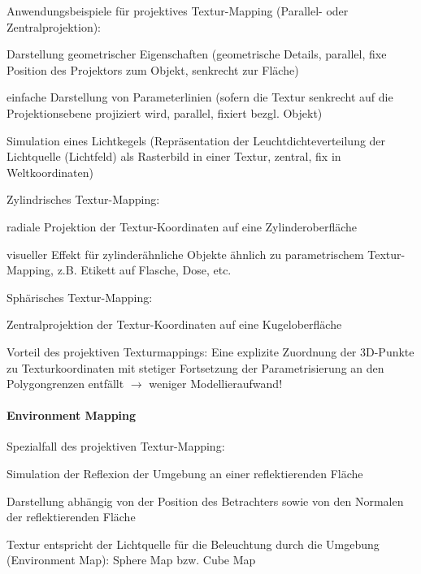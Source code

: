 \documentclass[landscape]{article}
\begin{document}
\begin{multicols}{3}
  Anwendungsbeispiele für projektives Textur-Mapping (Parallel- oder Zentralprojektion):
  \begin{itemize*}
    \item Darstellung geometrischer Eigenschaften (geometrische Details, parallel, fixe Position des Projektors zum Objekt, senkrecht zur Fläche)
    \item einfache Darstellung von Parameterlinien (sofern die Textur senkrecht auf die Projektionsebene projiziert wird, parallel, fixiert bezgl. Objekt)
    \item Simulation eines Lichtkegels (Repräsentation der Leuchtdichteverteilung der Lichtquelle (Lichtfeld) als Rasterbild in einer Textur, zentral, fix in Weltkoordinaten)
  \end{itemize*}
  
  Zylindrisches Textur-Mapping:
  \begin{itemize*}
    \item radiale Projektion der Textur-Koordinaten auf eine Zylinderoberfläche
    \item visueller Effekt für zylinderähnliche Objekte ähnlich zu parametrischem Textur-Mapping, z.B. Etikett auf Flasche, Dose, etc.
  \end{itemize*}
  
  Sphärisches Textur-Mapping:
  \begin{itemize*}
    \item Zentralprojektion der Textur-Koordinaten auf eine Kugeloberfläche
    \item Vorteil des projektiven Texturmappings: Eine explizite Zuordnung der 3D-Punkte zu Texturkoordinaten mit stetiger Fortsetzung der Parametrisierung an den Polygongrenzen entfällt $\rightarrow$ weniger Modellieraufwand!
  \end{itemize*}
  
  \paragraph{Environment Mapping}
  Spezialfall des projektiven Textur-Mapping:
  \begin{itemize*}
    \item Simulation der Reflexion der Umgebung an einer reflektierenden Fläche
    \item Darstellung abhängig von der Position des Betrachters sowie von den Normalen der reflektierenden Fläche
    \item Textur entspricht der Lichtquelle für die Beleuchtung durch die Umgebung (Environment Map): Sphere Map bzw. Cube Map
  \end{itemize*}
  

\end{multicols}
\end{document}
